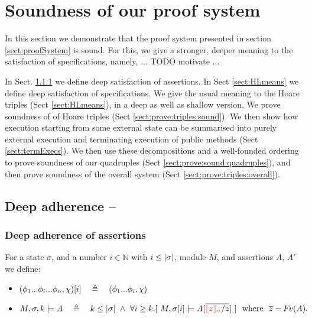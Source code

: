\section{Soundness of our proof system}

In this section we demonstrate that the proof system presented in section \ref{sect:proofSystem} is sound. 
For this, we give a stronger, deeper meaning to the satisfaction of specifications, namely, ... TODO motivate ... 

In Sect.  \ref{s:deep:mean} we define deep satisfaction of assertions. 
In Sect \ref{sect:HLmeans} we define deep satisfaction of specifications.
We give the usual meaning to the Hoare triples (Sect \ref{sect:HLmeans}), in a deep as well as shallow version,
We prove soundness of of Hoare triples (Sect \ref{sect:prove:triples:sound}).
We then show how execution starting from some external state can be summarised into purely external execution and terminating execution of public methods (Sect \ref{sect:termExecs}). We then use these decompositions and a well-founded ordering to prove soundness of our quadruples  (Sect \ref{sect:prove:sound:quadruples}), and then prove soundness of the overall system  (Sect \ref{sect:prove:triples:overall}). 



\subsection{Deep adherence    -- } 

\subsubsection{Deep adherence of assertions}
\label{s:deep:mean}

\begin{definition}%
\label{def:restrict}
For a state $\sigma$, and a number $i\in \mathbb{N}$ with $i \leq |\sigma|$,   module $M$, and assertions $A$, $A'$ we define: %
\begin{itemize}
\item
 $\RestictTo {(\phi_1...\phi_i...\phi_n,\chi)} {i}\ \ \ \triangleq \ \ \ (\phi_1...\phi_i,\chi)$
%
\item
$  \satDAssertFrom M  \sigma k   A  \ \  \ \triangleq \  \ \  
  k\leq  \DepthSt {\sigma} \ \wedge \  \forall i\geq k.[\ M,{\RestictTo {\sigma}{i}} \models A[\overline{ {\red{\interpret \sigma z}/ z}}]\ ] \ \  \mbox{where} \ \
  \overline z=\fv(A).$ 
\end{itemize}
\end{definition}
 
